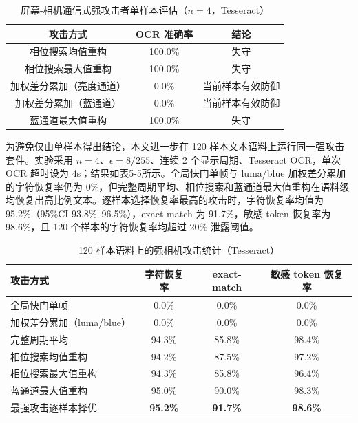 \begin{table}[htbp]
  \centering
  \caption{屏幕-相机通信式强攻击者单样本评估（$n=4$，Tesseract）}
  \begin{tabular}{ccc}
    \toprule
    攻击方式 & OCR 准确率 & 结论 \\
    \midrule
    相位搜索均值重构 & 100.0\% & 失守 \\
    相位搜索最大值重构 & 100.0\% & 失守 \\
    加权差分累加（亮度通道） & 0.0\% & 当前样本有效防御 \\
    加权差分累加（蓝通道） & 0.0\% & 当前样本有效防御 \\
    蓝通道最大值重构 & 100.0\% & 失守 \\
    \bottomrule
  \end{tabular}
\end{table}

为避免仅由单样本得出结论，本文进一步在 120 样本文本语料上运行同一强攻击套件。实验采用 $n=4$、$\epsilon=8/255$、连续 2 个显示周期、Tesseract OCR，单次 OCR 超时设为 4s；结果如表5-5所示。全局快门单帧与 luma/blue 加权差分累加的字符恢复率仍为 0\%，但完整周期平均、相位搜索和蓝通道最大值重构在语料级均恢复出高比例文本。逐样本选择恢复率最高的攻击时，字符恢复率均值为 95.2\%（95\%CI 93.8\%--96.5\%），exact-match 为 91.7\%，敏感 token 恢复率为 98.6\%，且 120 个样本的字符恢复率均超过 20\% 泄露阈值。

\begin{table}[htbp]
  \centering
  \caption{120 样本语料上的强相机攻击统计（Tesseract）}
  \small
  \begin{tabular}{lccc}
    \toprule
    攻击方式 & 字符恢复率 & exact-match & 敏感 token 恢复率 \\
    \midrule
    全局快门单帧 & 0.0\% & 0.0\% & 0.0\% \\
    加权差分累加（luma/blue） & 0.0\% & 0.0\% & 0.0\% \\
    完整周期平均 & 94.3\% & 85.8\% & 98.4\% \\
    相位搜索均值重构 & 94.2\% & 87.5\% & 97.2\% \\
    相位搜索最大值重构 & 94.3\% & 85.8\% & 96.4\% \\
    蓝通道最大值重构 & 95.0\% & 90.0\% & 98.3\% \\
    最强攻击逐样本择优 & \textbf{95.2\%} & \textbf{91.7\%} & \textbf{98.6\%} \\
    \bottomrule
  \end{tabular}
\end{table}


